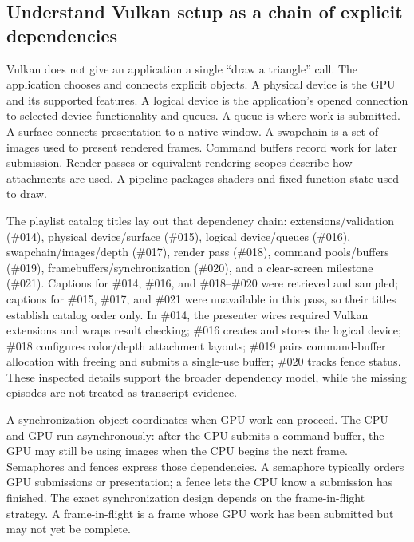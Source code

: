 \subsection{Understand Vulkan setup as a chain of explicit dependencies}\label{06-engine-ii-ch025-understand-vulkan-setup-as-a-chain-of-explicit-dependencies}

\hypertarget{06-engine-ii-ch025-understand-vulkan-setup-as-a-chain-of-explicit-dependencies}{}

Vulkan does not give an application a single ``draw a triangle'' call. The application chooses and connects explicit objects. A physical device is the GPU and its supported features. A logical device is the application's opened connection to selected device functionality and queues. A queue is where work is submitted. A surface connects presentation to a native window. A swapchain is a set of images used to present rendered frames. Command buffers record work for later submission. Render passes or equivalent rendering scopes describe how attachments are used. A pipeline packages shaders and fixed-function state used to draw.

The playlist catalog titles lay out that dependency chain: extensions/validation (\#014), physical device/surface (\#015), logical device/queues (\#016), swapchain/images/depth (\#017), render pass (\#018), command pools/buffers (\#019), framebuffers/synchronization (\#020), and a clear-screen milestone (\#021). Captions for \#014, \#016, and \#018--\#020 were retrieved and sampled; captions for \#015, \#017, and \#021 were unavailable in this pass, so their titles establish catalog order only. In \#014, the presenter wires required Vulkan extensions and wraps result checking; \#016 creates and stores the logical device; \#018 configures color/depth attachment layouts; \#019 pairs command-buffer allocation with freeing and submits a single-use buffer; \#020 tracks fence status. These inspected details support the broader dependency model, while the missing episodes are not treated as transcript evidence.

A synchronization object coordinates when GPU work can proceed. The CPU and GPU run asynchronously: after the CPU submits a command buffer, the GPU may still be using images when the CPU begins the next frame. Semaphores and fences express those dependencies. A semaphore typically orders GPU submissions or presentation; a fence lets the CPU know a submission has finished. The exact synchronization design depends on the frame-in-flight strategy. A frame-in-flight is a frame whose GPU work has been submitted but may not yet be complete.


